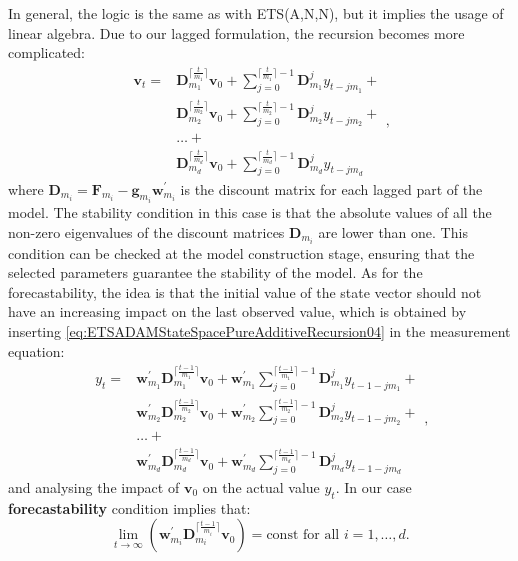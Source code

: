 \documentclass[
]{book}
\theoremstyle{definition}
\theoremstyle{definition}
\theoremstyle{definition}
\theoremstyle{definition}
\theoremstyle{remark}
\begin{document}
In general, the logic is the same as with ETS(A,N,N), but it implies the usage of linear algebra. Due to our lagged formulation, the recursion becomes more complicated:
\begin{equation}
  \begin{aligned}
    \mathbf{v}_{t} = & \mathbf{D}_{m_1}^{\lceil\frac{t}{m_1}\rceil} \mathbf{v}_{0} + \sum_{j=0}^{\lceil\frac{t}{m_1}\rceil-1} \mathbf{D}_{m_1}^{j} y_{t - j m_1} + \\
    & \mathbf{D}_{m_2}^{\lceil\frac{t}{m_2}\rceil} \mathbf{v}_{0} + \sum_{j=0}^{\lceil\frac{t}{m_2}\rceil-1} \mathbf{D}_{m_2}^j y_{t - j m_2} + \\
    & \dots + \\
    & \mathbf{D}_{m_d}^{\lceil\frac{t}{m_d}\rceil} \mathbf{v}_{0} + \sum_{j=0}^{\lceil\frac{t}{m_d}\rceil-1} \mathbf{D}_{m_d}^j y_{t - j m_d}
  \end{aligned},
  \label{eq:ETSADAMStateSpacePureAdditiveRecursion04}
\end{equation}
where \(\mathbf{D}_{m_i} = \mathbf{F}_{m_i} - \mathbf{g}_{m_i} \mathbf{w}_{m_i}^\prime\) is the discount matrix for each lagged part of the model. The stability condition in this case is that the absolute values of all the non-zero eigenvalues of the discount matrices \(\mathbf{D}_{m_i}\) are lower than one. This condition can be checked at the model construction stage, ensuring that the selected parameters guarantee the stability of the model. As for the forecastability, the idea is that the initial value of the state vector should not have an increasing impact on the last observed value, which is obtained by inserting \eqref{eq:ETSADAMStateSpacePureAdditiveRecursion04} in the measurement equation:
\begin{equation}
  \begin{aligned}
  y_t = & \mathbf{w}_{m_1}^\prime \mathbf{D}_{m_1}^{\lceil\frac{t-1}{m_1}\rceil} \mathbf{v}_{0} + \mathbf{w}_{m_1}^\prime \sum_{j=0}^{\lceil\frac{t-1}{m_1}\rceil-1} \mathbf{D}_{m_1}^{j} y_{t-1 - j m_1} + \\
        & \mathbf{w}_{m_2}^\prime \mathbf{D}_{m_2}^{\lceil\frac{t-1}{m_2}\rceil} \mathbf{v}_{0} + \mathbf{w}_{m_2}^\prime \sum_{j=0}^{\lceil\frac{t-1}{m_2}\rceil-1} \mathbf{D}_{m_2}^j y_{t-1 - j m_2} + \\
        & \dots + \\
        & \mathbf{w}_{m_d}^\prime \mathbf{D}_{m_d}^{\lceil\frac{t-1}{m_d}\rceil} \mathbf{v}_{0} + \mathbf{w}_{m_d}^\prime \sum_{j=0}^{\lceil\frac{t-1}{m_d}\rceil-1} \mathbf{D}_{m_d}^j y_{t-1 - j m_d}
  \end{aligned},
  \label{eq:ETSADAMStateSpacePureAdditiveRecursionForecastability}
\end{equation}
and analysing the impact of \(\mathbf{v}_0\) on the actual value \(y_t\). In our case \textbf{forecastability} condition implies that:
\begin{equation}
  \lim\limits_{t\rightarrow\infty}\left(\mathbf{w}_{m_i}^\prime\mathbf{D}_{m_i}^{\lceil\frac{t-1}{m_i}\rceil} \mathbf{v}_{0}\right) = \text{const for all } i=1, \dots, d.
  \label{eq:ETSADAMStateSpacePureAdditiveRecursionForecastabilityFinal}
\end{equation}
\end{document}
